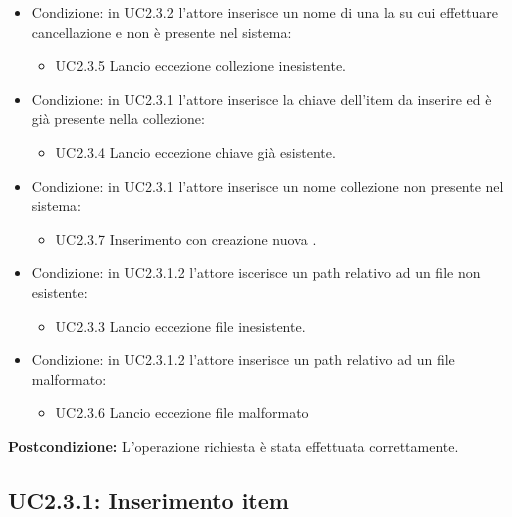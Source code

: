 \documentclass{scalatekids-article}
\begin{document}
\begin{itemize}
\item Condizione: in UC2.3.2 l'attore inserisce un nome di una la  su cui effettuare cancellazione e non è presente nel sistema:
  \begin{itemize}
  \item UC2.3.5 Lancio eccezione collezione inesistente.
  \end{itemize}
\item Condizione: in UC2.3.1 l'attore inserisce la chiave dell'item da inserire ed è già presente nella collezione:
  \begin{itemize}
  \item UC2.3.4 Lancio eccezione chiave già esistente.
  \end{itemize}
\item Condizione: in UC2.3.1 l'attore inserisce un nome collezione non presente nel sistema:
  \begin{itemize}
  \item UC2.3.7 Inserimento con creazione nuova .
  \end{itemize}
\item Condizione: in UC2.3.1.2 l'attore iscerisce un path relativo ad un file non esistente:
  \begin{itemize}
  \item UC2.3.3 Lancio eccezione file inesistente.
  \end{itemize}
\item Condizione: in UC2.3.1.2 l'attore inserisce un path relativo ad un file malformato: %
  \begin{itemize}
  \item UC2.3.6 Lancio eccezione file malformato
  \end{itemize}
\end{itemize}
\textbf{Postcondizione:} L'operazione richiesta è stata effettuata correttamente.

\subsection{UC2.3.1: Inserimento item}
\end{document}
